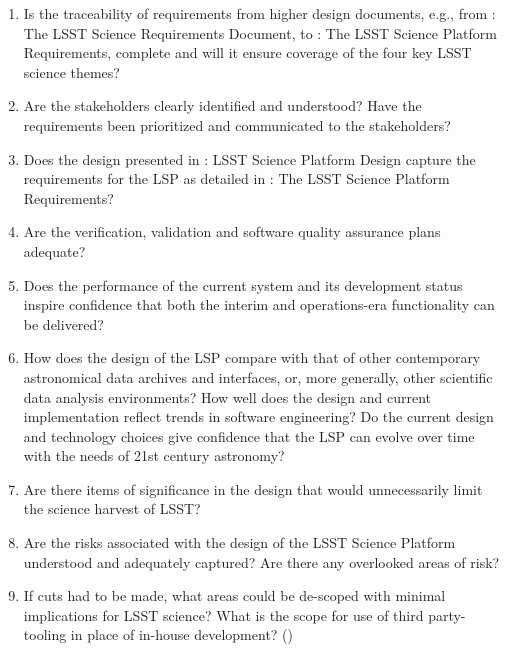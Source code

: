 \documentclass[DM,lsstdraft,STS,toc]{lsstdoc}
\begin{document}
\begin{enumerate}
\item Is the traceability of requirements from higher design documents, e.g., from : The LSST Science Requirements Document,
to : The LSST Science Platform Requirements, complete and will it ensure coverage of the four key LSST science themes?
%
\item Are the stakeholders clearly identified and understood? Have the requirements been prioritized and communicated to the stakeholders?
%
\item Does the design presented in : LSST Science Platform Design capture the requirements for the LSP as detailed in : The LSST Science Platform Requirements?
%
\item Are the verification, validation and software quality assurance plans adequate?
%
\item Does the performance of the current system and its development status inspire confidence that both the interim and operations-era functionality can be delivered?
%
\item How does the design of the LSP compare with that of other contemporary astronomical data archives and interfaces, or, more generally, other scientific data analysis environments? How well does the design and current implementation reflect trends in software engineering? Do the current design and technology choices give confidence that the LSP can evolve over time with the needs of 21st century astronomy?
%
\item Are there items of significance in the design that would unnecessarily limit the science harvest of LSST?
%
\item Are the risks associated with the design of the LSST Science Platform understood and adequately captured? Are there any overlooked areas of risk?
%
\item If cuts had to be made, what areas could be de-scoped with minimal implications for LSST science? What is the scope for use of third party-tooling in place of in-house development? 
({\color{red}{Note: If DM-10 or the variant to freeze rather than eliminate the Portal is invoked, this question will be rephrased to reflect accordingly.}})


\end{enumerate}
\end{document}

